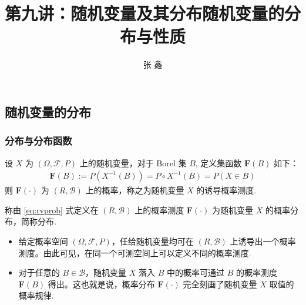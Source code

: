 \subsection{随机变量的分布}
\title [概率论]{第九讲：随机变量及其分布随机变量的分布与性质}
\author [张鑫 {\rm Email: x.zhang.seu@foxmail.com} ]{\large 张 鑫}
\date{}
\begin{frame}
	\frametitle{分布与分布函数}
	\begin{thm}
		设 $X$ 为 $(\Omega,\mathcal{F},P)$ 上的随机变量，对于 Borel 集 $B$, 定义集函数 $\mathbf{F}(B)$ 如下：
		\begin{eqnarray}\label{eq:rvprob}
			\mathbf{F}(B):=P(X^{-1}(B))=P\circ X^{-1}(B)=P(X\in B)
		\end{eqnarray}
		则 $\mathbf{F}(\cdot)$ 为 $(R,\mathcal{B})$ 上的概率，称之为随机变量 $X$ 的诱导概率测度.
	\end{thm}
	\vspace{0.2cm}
	\pause
	\begin{defi}
		称由 \eqref{eq:rvprob} 式定义在 $(R,\mathcal{B})$ 上的概率测度 $\mathbf{F}(\cdot)$ 为随机变量 $X$ 的概率分布，简称分布.
	\end{defi}
	\pause
	\vspace{0.2cm}
	\begin{itemize}[<+-|alert@+>]
		\item 给定概率空间 $(\Omega,\mathcal{F},P)$，任给随机变量均可在 $(R,\mathcal{B})$ 上诱导出一个概率测度。由此可见，在同一个可测空间上可以定义不同的概率测度.
		\item 对于任意的 $B\in \mathcal{B}$，随机变量 $X$ 落入 $B$ 中的概率可通过 $B$ 的概率测度 $\mathbf{F}(B)$ 得出。这也就是说，概率分布 $\mathbf{F}(\cdot)$ 完全刻画了随机变量 $X$ 取值的概率规律.
	\end{itemize}
\end{frame}


